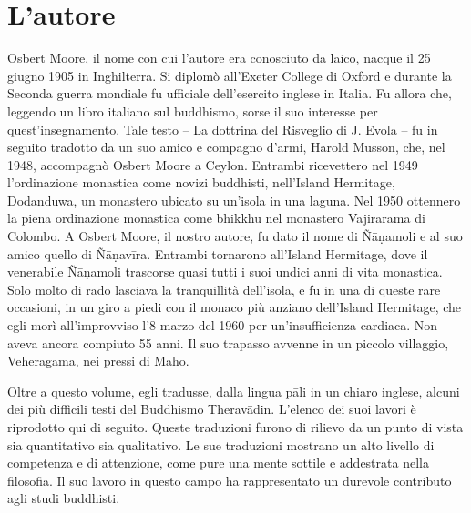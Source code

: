 \chapter{L'autore}

Osbert Moore, il nome con cui l’autore era conosciuto da laico, nacque
il 25 giugno 1905 in Inghilterra. Si diplomò all’Exeter College di Oxford
e durante la Seconda guerra mondiale fu ufficiale dell’esercito inglese
in Italia. Fu allora che, leggendo un libro italiano sul buddhismo,
sorse il suo interesse per quest’insegnamento. Tale testo – La dottrina
del Risveglio di J. Evola – fu in seguito tradotto da un suo amico e
compagno d’armi, Harold Musson, che, nel 1948, accompagnò Osbert Moore a
Ceylon. Entrambi ricevettero nel 1949 l’ordinazione monastica come
novizi buddhisti, nell’Island Hermitage, Dodanduwa, un monastero ubicato
su un’isola in una laguna. Nel 1950 ottennero la piena ordinazione
monastica come bhikkhu nel monastero Vajirarama di Colombo. A Osbert
Moore, il nostro autore, fu dato il nome di Ñāṇamoli e al suo amico
quello di Ñāṇavīra. Entrambi tornarono all’Island Hermitage, dove il
venerabile Ñāṇamoli trascorse quasi tutti i suoi undici anni di vita
monastica. Solo molto di rado lasciava la tranquillità dell’isola, e fu
in una di queste rare occasioni, in un giro a piedi con il monaco più
anziano dell’Island Hermitage, che egli morì all’improvviso l’8 marzo
del 1960 per un’insufficienza cardiaca. Non aveva ancora compiuto 55 anni. Il
suo trapasso avvenne in un piccolo villaggio, Veheragama, nei pressi di
Maho.


Oltre a questo volume, egli tradusse, dalla lingua pāli in un chiaro
inglese, alcuni dei più difficili testi del Buddhismo Theravādin.
L’elenco dei suoi lavori è riprodotto qui di seguito. Queste traduzioni
furono di rilievo da un punto di vista sia quantitativo sia qualitativo.
Le sue traduzioni mostrano un alto livello di competenza e di
attenzione, come pure una mente sottile e addestrata nella filosofia. Il
suo lavoro in questo campo ha rappresentato un durevole contributo agli
studi buddhisti.


